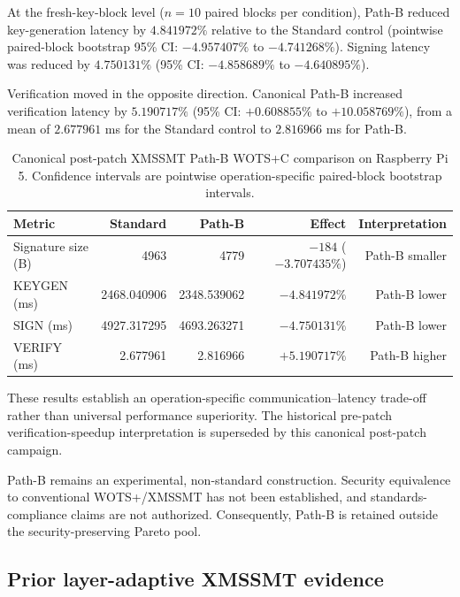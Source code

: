 \documentclass[pdflatex,sn-mathphys-num]{sn-jnl}
\begin{document}
At the fresh-key-block level ($n=10$ paired blocks per
condition), Path-B reduced key-generation latency by
$4.841972\%$ relative to the Standard control
(pointwise paired-block bootstrap 95\% CI:
$-4.957407\%$ to $-4.741268\%$). Signing latency was reduced by
$4.750131\%$ (95\% CI:
$-4.858689\%$ to $-4.640895\%$).

Verification moved in the opposite direction. Canonical Path-B
increased verification latency by $5.190717\%$
(95\% CI: $+0.608855\%$ to $+10.058769\%$), from a mean of
$2.677961$ ms for the Standard control to $2.816966$ ms for
Path-B.

\begin{table}[htbp]
\centering
\caption{Canonical post-patch XMSSMT Path-B WOTS+C comparison
on Raspberry Pi 5. Confidence intervals are pointwise
operation-specific paired-block bootstrap intervals.}
\label{tab:pathb-canonical-postpatch}
\begin{tabular}{lrrrr}
\hline
Metric & Standard & Path-B & Effect & Interpretation \\
\hline
Signature size (B)
& 4963 & 4779 & $-184$ ($-3.707435\%$) & Path-B smaller \\
KEYGEN (ms)
& 2468.040906 & 2348.539062 & $-4.841972\%$ & Path-B lower \\
SIGN (ms)
& 4927.317295 & 4693.263271 & $-4.750131\%$ & Path-B lower \\
VERIFY (ms)
& 2.677961 & 2.816966 & $+5.190717\%$ & Path-B higher \\
\hline
\end{tabular}
\end{table}

These results establish an operation-specific
communication--latency trade-off rather than universal
performance superiority. The historical pre-patch
verification-speedup interpretation is superseded by this
canonical post-patch campaign.

Path-B remains an experimental, non-standard construction.
Security equivalence to conventional WOTS+/XMSSMT has not been
established, and standards-compliance claims are not authorized.
Consequently, Path-B is retained outside the
security-preserving Pareto pool.

\subsection{Prior layer-adaptive XMSSMT evidence}
\label{subsec:prior_layer_adaptive_review}
\end{document}
